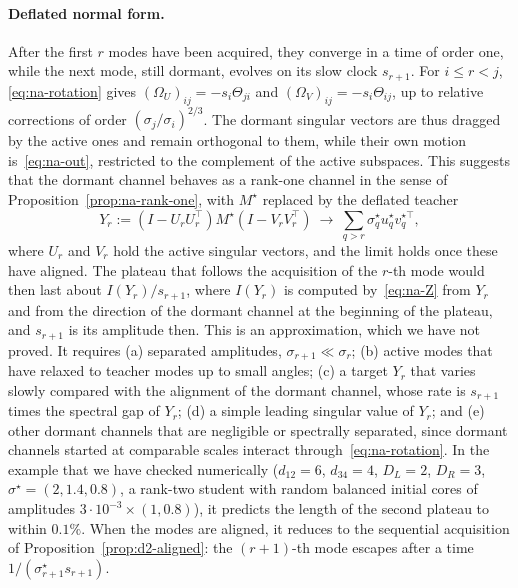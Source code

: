 \documentclass[11pt]{article}
\theoremstyle{definition}
\numberwithin{equation}{section}
\begin{document}
\paragraph{Deflated normal form.}
After the first $r$ modes have been acquired, they converge in a time of order one, while the next mode, still dormant, evolves on its slow clock $s_{r+1}$. For $i\le r<j$, \eqref{eq:na-rotation} gives $(\Omega_U)_{ij}=-s_i\Theta_{ji}$ and $(\Omega_V)_{ij}=-s_i\Theta_{ij}$, up to relative corrections of order $(\sigma_j/\sigma_i)^{2/3}$. The dormant singular vectors are thus dragged by the active ones and remain orthogonal to them, while their own motion is~\eqref{eq:na-out}, restricted to the complement of the active subspaces. This suggests that the dormant channel behaves as a rank-one channel in the sense of Proposition~\ref{prop:na-rank-one}, with $M^\star$ replaced by the deflated teacher
\begin{equation}\label{eq:na-deflated}
Y_r:=(I-U_rU_r^\top)M^\star(I-V_rV_r^\top)\ \longrightarrow\ \sum_{q>r}\sigma^\star_qu^\star_qv^{\star\top}_q,
\end{equation}
where $U_r$ and $V_r$ hold the active singular vectors, and the limit holds once these have aligned. The plateau that follows the acquisition of the $r$-th mode would then last about $I(Y_r)/s_{r+1}$, where $I(Y_r)$ is computed by~\eqref{eq:na-Z} from $Y_r$ and from the direction of the dormant channel at the beginning of the plateau, and $s_{r+1}$ is its amplitude then. This is an approximation, which we have not proved. It requires (a) separated amplitudes, $\sigma_{r+1}\ll\sigma_r$; (b) active modes that have relaxed to teacher modes up to small angles; (c) a target $Y_r$ that varies slowly compared with the alignment of the dormant channel, whose rate is $s_{r+1}$ times the spectral gap of $Y_r$; (d) a simple leading singular value of $Y_r$; and (e) other dormant channels that are negligible or spectrally separated, since dormant channels started at comparable scales interact through~\eqref{eq:na-rotation}. In the example that we have checked numerically ($d_{12}=6$, $d_{34}=4$, $D_L=2$, $D_R=3$, $\sigma^\star=(2,1.4,0.8)$, a rank-two student with random balanced initial cores of amplitudes $3\cdot10^{-3}\times(1,0.8)$), it predicts the length of the second plateau to within $0.1\%$. When the modes are aligned, it reduces to the sequential acquisition of Proposition~\ref{prop:d2-aligned}: the $(r+1)$-th mode escapes after a time $1/(\sigma^\star_{r+1}s_{r+1})$.

\end{document}
